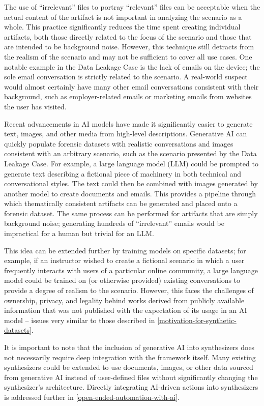 \documentclass[letterpaper,12pt]{report}
\begin{document}
The use of ``irrelevant'' files to portray ``relevant'' files can be
acceptable when the actual content of the artifact is not important in
analyzing the scenario as a whole. This practice significantly reduces
the time spent creating individual artifacts, both those directly
related to the focus of the scenario and those that are intended to be
background noise. However, this technique still detracts from the
realism of the scenario and may not be sufficient to cover all use
cases. One notable example in the Data Leakage Case is the lack of
emails on the device; the sole email conversation is strictly related to
the scenario. A real-world suspect would almost certainly have many
other email conversations consistent with their background, such as
employer-related emails or marketing emails from websites the user has
visited.

Recent advancements in AI models have made it significantly easier to
generate text, images, and other media from high-level descriptions.
Generative AI can quickly populate forensic datasets with realistic
conversations and images consistent with an arbitrary scenario, such as
the scenario presented by the Data Leakage Case. For example, a large
language model (LLM) could be prompted to generate text describing a
fictional piece of machinery in both technical and conversational
styles. The text could then be combined with images generated by another
model to create documents and emails. This provides a pipeline through
which thematically consistent artifacts can be generated and placed onto
a forensic dataset. The same process can be performed for artifacts that
are simply background noise; generating hundreds of ``irrelevant''
emails would be impractical for a human but trivial for an LLM.

This idea can be extended further by training models on specific
datasets; for example, if an instructor wished to create a fictional
scenario in which a user frequently interacts with users of a particular
online community, a large language model could be trained on (or
otherwise provided) existing conversations to provide a degree of
realism to the scenario. However, this faces the challenges of
ownership, privacy, and legality behind works derived from publicly
available information that was not published with the expectation of its
usage in an AI model -- issues very similar to those described in
\autoref{motivation-for-synthetic-datasets}.

It is important to note that the inclusion of generative AI into
synthesizers does not necessarily require deep integration with the
framework itself. Many existing synthesizers could be extended to use
documents, images, or other data sourced from generative AI instead of
user-defined files without significantly changing the synthesizer's
architecture. Directly integrating AI-driven actions into synthesizers
is addressed further in \autoref{open-ended-automation-with-ai}.
\end{document}
